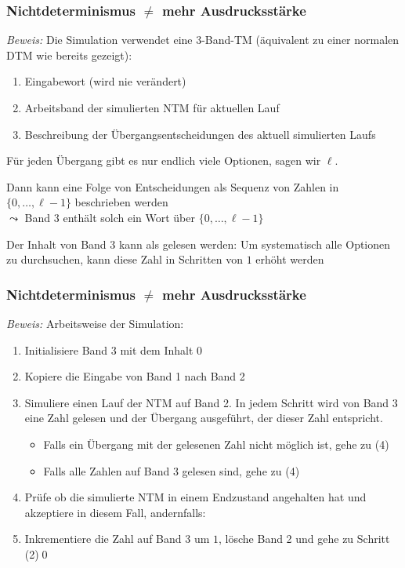 \documentclass[onlymath]{beamer}
\begin{document}
\begin{frame}[t]\frametitle{Nichtdeterminismus $\neq$ mehr Ausdrucksstärke}

\pause

\emph{Beweis:} Die Simulation verwendet eine 3-Band-TM (äquivalent zu einer normalen DTM wie bereits gezeigt):
\begin{enumerate}
\item Eingabewort (wird nie verändert)
\item Arbeitsband der simulierten NTM für aktuellen Lauf
\item Beschreibung der Übergangsentscheidungen des aktuell simulierten Laufs
\end{enumerate}\pause
Für jeden Übergang gibt es nur endlich viele Optionen, sagen wir $\ell$.\medskip\pause%

Dann kann eine Folge von Entscheidungen als Sequenz von Zahlen in $\{0,\ldots, \ell-1\}$ beschrieben werden\\
$\leadsto$ Band 3 enthält solch ein Wort über $\{0,\ldots, \ell-1\}$\medskip\pause%

Der Inhalt von Band 3 kann als  gelesen werden: Um systematisch alle Optionen
zu durchsuchen, kann diese Zahl in Schritten von $1$ erhöht werden

\end{frame}

\begin{frame}[t]\frametitle{Nichtdeterminismus $\neq$ mehr Ausdrucksstärke}


\emph{Beweis:} Arbeitsweise der Simulation:\pause
\begin{enumerate}[(1)]
\item Initialisiere Band 3 mit dem Inhalt $0$\pause
\item Kopiere die Eingabe von Band 1 nach Band 2\pause
\item Simuliere einen Lauf der NTM auf Band 2. In jedem Schritt wird von Band 3 eine Zahl gelesen
und der Übergang ausgeführt, der dieser Zahl entspricht.
\begin{itemize}
\item Falls ein Übergang mit der gelesenen Zahl nicht möglich ist, gehe zu (4)
\item Falls alle Zahlen auf Band 3 gelesen sind, gehe zu (4)
\end{itemize}\pause
\item Prüfe ob die simulierte NTM in einem Endzustand angehalten hat und akzeptiere in diesem Fall, andernfalls:
\item Inkrementiere die Zahl auf Band 3 um $1$, lösche Band 2 und gehe zu Schritt (2)\qed
\end{enumerate}

\end{frame}
\end{document}
